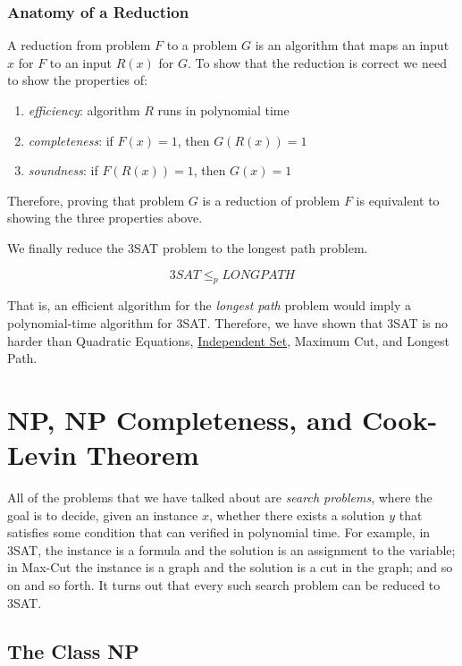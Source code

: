 \subsubsection{Anatomy of a Reduction}

  A reduction from problem $F$ to a problem $G$ is an algorithm that maps an input $x$ for $F$ to an input $R(x)$ for $G$. To show that the reduction is correct we need to show the properties of: 
  \begin{enumerate}
      \item \textit{efficiency}: algorithm $R$ runs in polynomial time
      \item \textit{completeness}: if $F(x) = 1$, then $G(R(x)) = 1$ 
      \item \textit{soundness}: if $F(R(x)) = 1$, then $G(x) = 1$
  \end{enumerate}
  Therefore, proving that problem $G$ is a reduction of problem $F$ is equivalent to showing the three properties above. 

  We finally reduce the 3SAT problem to the longest path problem. 

  \begin{theorem}
    \label{thm:hardness-of-longest-path}
  \begin{equation}
    3SAT \leq_p LONGPATH
  \end{equation}
  \end{theorem}
  That is, an efficient algorithm for the \textit{longest path} problem would imply a polynomial-time algorithm for 3SAT. Therefore, we have shown that 3SAT is no harder than Quadratic Equations, \hyperref[def:independent-set]{Independent Set}, Maximum Cut, and Longest Path. 

\section{NP, NP Completeness, and Cook-Levin Theorem}

  All of the problems that we have talked about are \textit{search problems}, where the goal is to decide, given an instance $x$, whether there exists a solution $y$ that satisfies some condition that can verified in polynomial time. For example, in 3SAT, the instance is a formula and the solution is an assignment to the variable; in Max-Cut the instance is a graph and the solution is a cut in the graph; and so on and so forth. It turns out that every such search problem can be reduced to 3SAT. 

\subsection{The Class NP}

